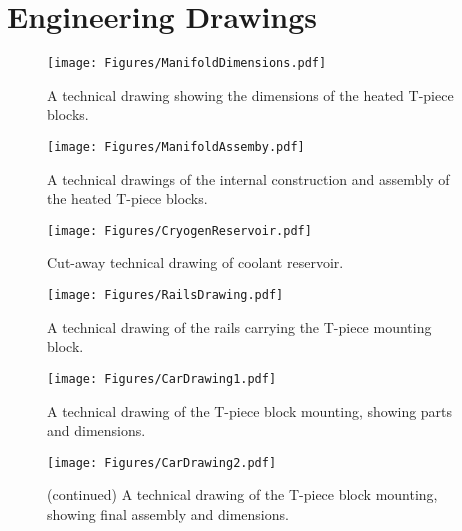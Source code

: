 
\chapter{Engineering Drawings} %

\label{AppendixD} 

\begin{figure}
	\centering
	\texttt{[image: Figures/ManifoldDimensions.pdf]}
	\decoRule
	\caption[Manifold dimensions.]{A technical drawing showing the dimensions of the heated T-piece blocks.}	
	\label{fig:ManifoldDims}
\end{figure}

\begin{figure}
	\centering
	\texttt{[image: Figures/ManifoldAssemby.pdf]}
	\decoRule	
	\caption[Manifold assembly.]{A technical drawings of the internal construction and assembly of the heated T-piece blocks.}
	\label{fig:ManifoldAssy}
\end{figure}

\begin{figure}
	\centering
	\texttt{[image: Figures/CryogenReservoir.pdf]}
	\decoRule
	\caption[Coolant reservoir]{Cut-away technical drawing of coolant reservoir.}	
	\label{fig:CryogenReservoir}
\end{figure}

\begin{figure}
	\centering
	\texttt{[image: Figures/RailsDrawing.pdf]}
	\decoRule	
	
	\caption[Technical drawing of coaxial heater mounting
	rails]{\label{fig:RailsDrawing}A technical drawing of the rails carrying the
	T-piece mounting block.}
	
\end{figure}

\begin{figure}
	\centering
	\texttt{[image: Figures/CarDrawing1.pdf]}
	\decoRule	
	
	\caption[Technical drawing of coaxial heater mounting.]{A technical drawing of
	the T-piece block mounting, showing parts and dimensions.}
	
	\label{fig:CarsDrawing1}
\end{figure}

\begin{figure}
	\ContinuedFloat
	\centering
	\texttt{[image: Figures/CarDrawing2.pdf]}
	\decoRule	
	
	\caption[]{(continued) A technical drawing of the T-piece block mounting,
	showing final assembly and dimensions.}
	
\end{figure}

